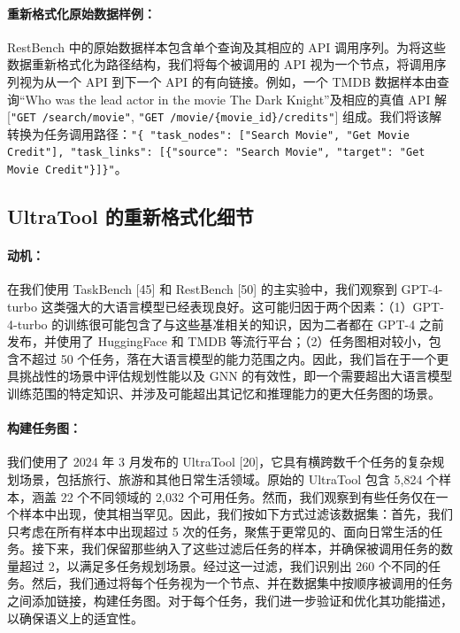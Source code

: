 \documentclass[11pt,UTF8,fontset=fandol]{ctexart}
\begin{document}
\paragraph{重新格式化原始数据样例：}RestBench 中的原始数据样本包含单个查询及其相应的 API 调用序列。为将这些数据重新格式化为路径结构，我们将每个被调用的 API 视为一个节点，将调用序列视为从一个 API 到下一个 API 的有向链接。例如，一个 TMDB 数据样本由查询“Who was the lead actor in the movie The Dark Knight”及相应的真值 API 解 [\texttt{"GET /search/movie"}, \texttt{"GET /movie/\{movie\_id\}/credits"}] 组成。我们将该解转换为任务调用路径：\texttt{"\{ "task\_nodes": ["Search Movie", "Get Movie Credit"], "task\_links": [\{"source": "Search Movie", "target": "Get Movie Credit"\}]\}"}。

\subsection{UltraTool 的重新格式化细节}

\paragraph{动机：}在我们使用 TaskBench [45] 和 RestBench [50] 的主实验中，我们观察到 GPT-4-turbo 这类强大的大语言模型已经表现良好。这可能归因于两个因素：（1）GPT-4-turbo 的训练很可能包含了与这些基准相关的知识，因为二者都在 GPT-4 之前发布，并使用了 HuggingFace 和 TMDB 等流行平台；（2）任务图相对较小，包含不超过 50 个任务，落在大语言模型的能力范围之内。因此，我们旨在于一个更具挑战性的场景中评估规划性能以及 GNN 的有效性，即一个需要超出大语言模型训练范围的特定知识、并涉及可能超出其记忆和推理能力的更大任务图的场景。

\paragraph{构建任务图：}我们使用了 2024 年 3 月发布的 UltraTool [20]，它具有横跨数千个任务的复杂规划场景，包括旅行、旅游和其他日常生活领域。原始的 UltraTool 包含 5{,}824 个样本，涵盖 22 个不同领域的 2{,}032 个可用任务。然而，我们观察到有些任务仅在一个样本中出现，使其相当罕见。因此，我们按如下方式过滤该数据集：首先，我们只考虑在所有样本中出现超过 5 次的任务，聚焦于更常见的、面向日常生活的任务。接下来，我们保留那些纳入了这些过滤后任务的样本，并确保被调用任务的数量超过 2，以满足多任务规划场景。经过这一过滤，我们识别出 260 个不同的任务。然后，我们通过将每个任务视为一个节点、并在数据集中按顺序被调用的任务之间添加链接，构建任务图。对于每个任务，我们进一步验证和优化其功能描述，以确保语义上的适宜性。
\end{document}
